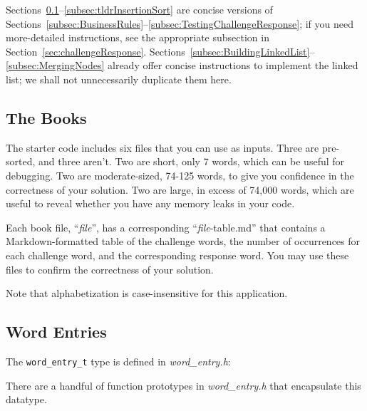 Sections~\ref{subsec:tldrBusinessRules}--\ref{subsec:tldrInsertionSort} are concise versions of Sections~\ref{subsec:BusinessRules}--\ref{subsec:TestingChallengeResponse};
if you need more-detailed instructions, see the appropriate subsection in Section~\ref{sec:challengeResponse}.
Sections~\ref{subsec:BuildingLinkedList}--\ref{subsec:MergingNodes} already offer concise instructions to implement the linked list;
we shall not unnecessarily duplicate them here.

\subsection{The Books} \label{subsec:tldrBusinessRules}

    The starter code includes six files that you can use as inputs.
    Three are pre-sorted, and three aren't.
    Two are short, only 7 words, which can be useful for debugging.
    Two are moderate-sized, 74-125 words, to give you confidence in the correctness of your solution.
    Two are large, in excess of 74,000 words, which are useful to reveal whether you have any memory leaks in your code.

    Each book file, ``\textit{file}'', has a corresponding ``\textit{file}-table.md'' that contains a Markdown-formatted table of the challenge words, the number of occurrences for each challenge word, and the corresponding response word.
    You may use these files to confirm the correctness of your solution.


    Note that alphabetization is case-insensitive for this application.


\subsection{Word Entries}

    The \lstinline{word_entry_t} type is defined in \textit{word\_entry.h}:

    

    There are a handful of function prototypes in \textit{word\_entry.h} that encapsulate this datatype.

